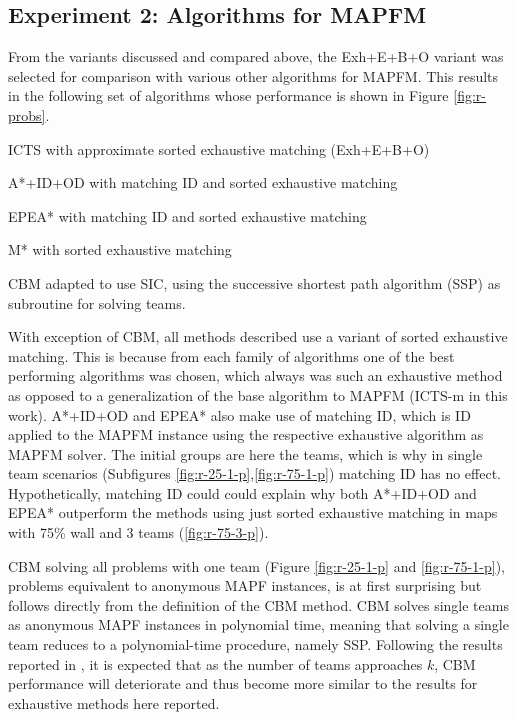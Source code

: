 \documentclass[english]{article}
\begin{document}
	\subsection{Experiment 2: Algorithms for MAPFM}
	From the variants discussed and compared above, the Exh+E+B+O variant was selected for comparison with various other algorithms for MAPFM. This results in the following set of algorithms whose performance is shown in Figure \ref{fig:r-probs}.
	\begin{itemize}
		\begin{minipage}{0.45\linewidth}
			\item ICTS with approximate sorted exhaustive matching (Exh+E+B+O)
			\item A*+ID+OD with matching ID and sorted exhaustive matching\cite{bruin2021}
			\item EPEA* with matching ID and sorted exhaustive matching\cite{jong2021}
		\end{minipage}
		\hspace{1cm}
		\begin{minipage}{0.40\linewidth}
			\item M* with sorted exhaustive matching\cite{donszelmann2021}
			\item CBM adapted to use SIC, using the successive shortest path algorithm (SSP) \cite{goldberg1987} as subroutine for solving teams\cite{baauw2021}.
		\end{minipage}
	\end{itemize}
	With exception of CBM, all methods described use a variant of sorted exhaustive matching. This is because from each family of algorithms one of the best performing algorithms was chosen, which always was such an exhaustive method as opposed to a generalization of the base algorithm to MAPFM (ICTS-m in this work). A*+ID+OD and EPEA* also make use of matching ID, which is ID applied to the MAPFM instance using the respective exhaustive algorithm as MAPFM solver. The initial groups are here the teams, which is why in single team scenarios (Subfigures \ref{fig:r-25-1-p},\ref{fig:r-75-1-p}) matching ID has no effect. Hypothetically, matching ID could could explain why both A*+ID+OD and EPEA* outperform the methods using just sorted exhaustive matching in maps with 75\% wall and 3 teams (\ref{fig:r-75-3-p}).
	
	CBM solving all problems with one team (Figure \ref{fig:r-25-1-p} and \ref{fig:r-75-1-p}), problems equivalent to anonymous MAPF instances, is at first surprising but follows directly from the definition of the CBM method. CBM solves single teams as anonymous MAPF instances in polynomial time, meaning that solving a single team reduces to a polynomial-time procedure, namely SSP. Following the results reported in \cite{ma2016}, it is expected that as the number of teams approaches $k$, CBM performance will deteriorate and thus become more similar to the results for exhaustive methods here reported.
\end{document}

